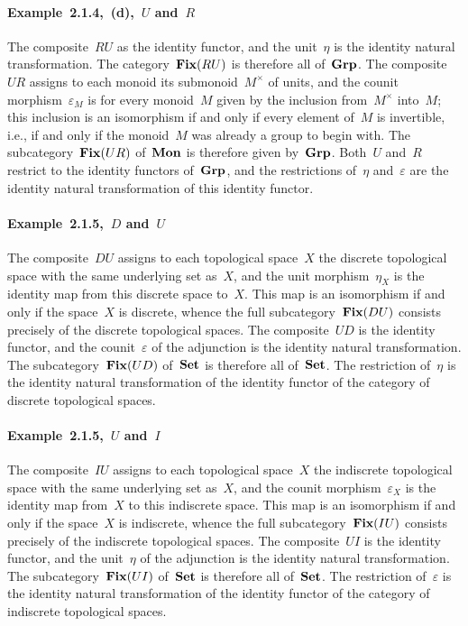 \paragraph{Example~2.1.4,~(d),~$U$ and~$R$}
The composite~$RU$ as the identity functor, and the unit~$η$ is the identity natural transformation.
The category~$\mathop{\mathbf{Fix}}(RU)$ is therefore all of~$\mathbf{Grp}$.
The composite~$UR$ assigns to each monoid its submonoid~$M^×$ of units, and the counit morphism~$ε_M$ is for every monoid~$M$ given by the inclusion from~$M^×$ into~$M$;
this inclusion is an isomorphism if and only if every element of~$M$ is invertible, i.e., if and only if the monoid~$M$ was already a group to begin with.
The subcategory~$\mathop{\mathbf{Fix}}(UR)$ of~$\mathbf{Mon}$ is therefore given by~$\mathbf{Grp}$.
Both~$U$ and~$R$ restrict to the identity functors of~$\mathbf{Grp}$, and the restrictions of~$η$ and~$ε$ are the identity natural transformation of this identity functor.

\paragraph{Example~2.1.5,~$D$ and~$U$}
The composite~$DU$ assigns to each topological space~$X$ the discrete topological space with the same underlying set as~$X$, and the unit morphism~$η_X$ is the identity map from this discrete space to~$X$.
This map is an isomorphism if and only if the space~$X$ is discrete, whence the full subcategory~$\mathop{\mathbf{Fix}}(DU)$ consists precisely of the discrete topological spaces.
The composite~$UD$ is the identity functor, and the counit~$ε$ of the adjunction is the identity natural transformation.
The subcategory~$\mathop{\mathbf{Fix}}(UD)$ of~$\mathbf{Set}$ is therefore all of~$\mathbf{Set}$.
The restriction of~$η$ is the identity natural transformation of the identity functor of the category of discrete topological spaces.

\paragraph{Example~2.1.5,~$U$ and~$I$}
The composite~$IU$ assigns to each topological space~$X$ the indiscrete topological space with the same underlying set as~$X$, and the counit morphism~$ε_X$ is the identity map from~$X$ to this indiscrete space.
This map is an isomorphism if and only if the space~$X$ is indiscrete, whence the full subcategory~$\mathop{\mathbf{Fix}}(IU)$ consists precisely of the indiscrete topological spaces.
The composite~$UI$ is the identity functor, and the unit~$η$ of the adjunction is the identity natural transformation.
The subcategory~$\mathop{\mathbf{Fix}}(UI)$ of~$\mathbf{Set}$ is therefore all of~$\mathbf{Set}$.
The restriction of~$ε$ is the identity natural transformation of the identity functor of the category of indiscrete topological spaces.

